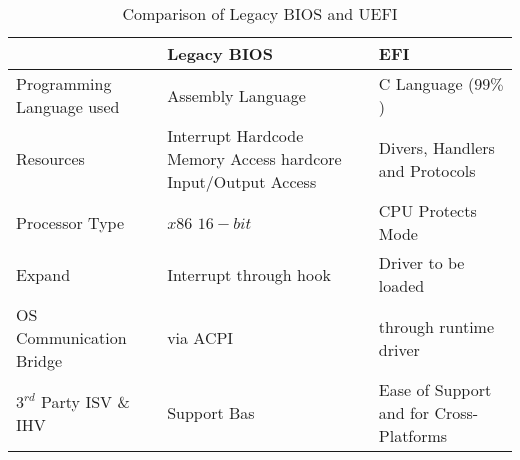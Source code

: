 \begin{table}
	\centering
	\renewcommand{\arraystretch}{2}
	\caption{Comparison of Legacy BIOS and UEFI}\label{table:legacy-bios-vs-uefi}
	\begin{tabular}{l | p{5cm} | p{5cm}}
		& Legacy BIOS & EFI
		\\ \hline \hline
		Programming Language used & Assembly Language & C Language ($ 99\% $)
		\\ \hline
		Resources & Interrupt Hardcode Memory Access hardcore Input/Output Access & Divers, Handlers and Protocols
		\\ \hline
		Processor Type & $ x86 $ $ 16-bit $ & CPU Protects Mode
		\\ \hline
		Expand & Interrupt through hook & Driver to be loaded
		\\ \hline
		OS Communication Bridge & via ACPI & through runtime driver
		\\ \hline
		$ 3^{rd} $ Party ISV \& IHV & Support Bas & Ease of Support and for Cross-Platforms
		\\ \hline
	\end{tabular}
\end{table}





